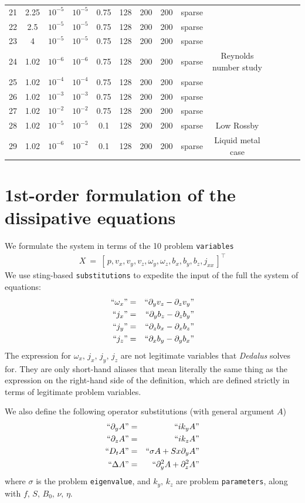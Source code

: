 \documentclass[aps,prl,preprint
,superscriptaddress]{revtex4-1}
\newcommand\Beq{\begin{eqnarray}}
\newcommand\Eeq{\end{eqnarray}}
\newcommand{\pd}[1]{\partial_{#1}}
\begin{document}
\begin{tabular}{cccccccccccccc}
21 & 2.25   & $10^{-5}$ & $10^{-5}$ & 0.75 & 128 & 200 & 200 & sparse & \\
22 & 2.5    & $10^{-5}$ & $10^{-5}$ & 0.75 & 128 & 200 & 200 & sparse & \\
23 & 4      & $10^{-5}$ & $10^{-5}$ & 0.75 & 128 & 200 & 200 & sparse & \\
24 & 1.02   & $10^{-6}$ & $10^{-6}$ & 0.75 & 128 & 200 & 200 & sparse & Reynolds number study\\
25 & 1.02   & $10^{-4}$ & $10^{-4}$ & 0.75 & 128 & 200 & 200 & sparse & \\
26 & 1.02   & $10^{-3}$ & $10^{-3}$ & 0.75 & 128 & 200 & 200 & sparse & \\
27 & 1.02   & $10^{-2}$ & $10^{-2}$ & 0.75 & 128 & 200 & 200 & sparse & \\
28 & 1.02   & $10^{-5}$ & $10^{-5}$ & 0.1  & 128 & 200 & 200 & sparse & Low Rossby\\ 
29 & 1.02   & $10^{-6}$ & $10^{-2}$ & 0.1  & 128 & 200 & 200 & sparse & Liquid metal case\\ 
\end{tabular}

\section{1st-order formulation of the dissipative equations}
\label{sec:formulation}

We formulate the system in terms of the 10 problem \texttt{variables} 
\Beq
X \ = \ \left[\,p,v_{x},v_{y},v_{z},\omega_{y},\omega_{z},b_{x},b_{y},b_{z},j_{xx}\,\right]^{\top} \nonumber
\Eeq
We use sting-based \texttt{substitutions} to expedite the input of the full the system of equations: 
\Beq
``\omega_{x}" &=& ``\pd{y} v_{z} - \pd{z} v_{y}" \nonumber \\
``j_{x}" &=& ``\pd{y} b_{z} - \pd{z} b_{y}" \nonumber \\
``j_{y}" &=& ``\pd{z} b_{x} - \pd{x} b_{z}" \nonumber \\
``j_{z}" &=& ``\pd{x} b_{y} - \pd{y} b_{x}" \nonumber 
\Eeq
The expression for $\omega_{x},\,j_{x},\,j_{y},\,j_{z}$ are not legitimate variables that \textit{Dedalus} solves for. 
They are only short-hand aliases that mean literally the same thing as the expression on the right-hand side of the definition, which are defined strictly in terms of legitimate problem variables. 

We also define the following operator substitutions (with general argument $A$)
\Beq
``\pd{y} A" &=& ``i k_{y} A" \nonumber \\
``\pd{z} A" &=& ``i k_{z} A" \nonumber \\
``D_{t} A" &=& ``\sigma A +S x \pd{y} A " \nonumber \\
``\Delta A" &=& ``\pd{y}^{2} A + \pd{z}^{2}A" \nonumber
\Eeq
where $\sigma$ is the problem \texttt{eigenvalue}, and $k_{y},\,k_{z}$ are problem \texttt{parameters}, along with $f,\,S,\,B_{0},\, \nu,\, \eta$. 
\end{document}
